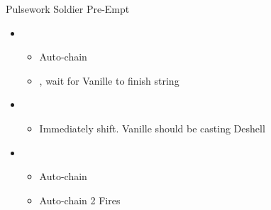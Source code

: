 \begin{battle}{Pulsework Soldier Pre-Empt}
\begin{itemize}
    \item \first
    \begin{itemize}
        \item Auto-chain
        \item \stagger, wait for Vanille to finish string
    \end{itemize}
    \item \fourth
    \begin{itemize}
        \item Immediately shift. Vanille should be casting Deshell
    \end{itemize}
    \item \first
    \begin{itemize}
        \item Auto-chain
        \item Auto-chain 2 Fires
    \end{itemize}
\end{itemize}
\end{battle}

